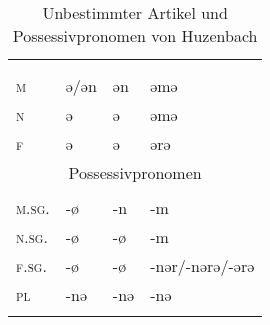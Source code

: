 
\begin{table}[H]
	\caption{Unbestimmter Artikel und Possessivpronomen von Huzenbach \citep[101, 104]{Baur1967}}\label{table112}
	\begin{tabular}{llll}
		\lsptoprule
		\multicolumn{4}{c}{unbestimmter Artikel}\\
		& \NOM & \AKK & \DAT\\\midrule
		\textsc{m} & ə/ǝn & ǝn & ǝmǝ\\
		\textsc{n} & ǝ & ǝ & ǝmǝ\\
		\textsc{f} & ǝ & ǝ & ǝrǝ\\\midrule
		\multicolumn{4}{c}{Possessivpronomen} \\       
		& \NOM & \AKK & \DAT\\\midrule
		\textsc{m.sg.} & {}-ø & {}-n & {}-m\\
		\textsc{n.sg.} & {}-ø & {}-ø & {}-m\\
		\textsc{f.sg.} & {}-ø & {}-ø & {}-nǝr/-nǝrǝ/-ǝrǝ\\
		\textsc{pl} & {}-nə & {}-nə & {}-nə\\
		\lspbottomrule
	\end{tabular}
\end{table}


